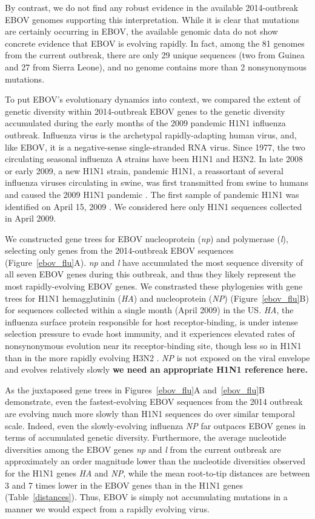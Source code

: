 \documentclass[11pt]{article}
\begin{document}
By contrast, we do not find any robust evidence in the available 2014-outbreak EBOV genomes supporting this interpretation. While it is clear that mutations are certainly occurring in EBOV, the available genomic data do not show concrete evidence that EBOV is evolving rapidly. In fact, among the 81 genomes from the current outbreak, there are only 29 unique sequences (two from Guinea and 27 from Sierra Leone), and no genome contains more than 2 nonsynonymous mutations.

To put EBOV's evolutionary dynamics into context, we compared the extent of genetic diversity within 2014-outbreak EBOV genes to the genetic diversity accumulated during the early months of the 2009 pandemic H1N1 influenza outbreak. Influenza virus is the archetypal rapidly-adapting human virus, and, like EBOV, it is a negative-sense single-stranded RNA virus. Since 1977, the two circulating seasonal influenza A strains have been H1N1 and H3N2. In late 2008 or early 2009, a new H1N1 strain, pandemic H1N1, a reassortant of several influenza viruses circulating in swine, was first transmitted from swine to humans and caused the 2009 H1N1 pandemic \cite{Smithetal2009}. The first sample of pandemic H1N1 was identified on April 15, 2009 \citep{Neumannetal2009}. We considered here only H1N1 sequences collected in April 2009. 

We constructed gene trees for EBOV nucleoprotein (\emph{np}) and polymerase (\emph{l}), selecting only genes from the 2014-outbreak EBOV sequences (Figure~\ref{ebov_flu}A). \emph{np} and \emph{l} have accumulated the most sequence diversity of all seven EBOV genes during this outbreak, and thus they likely represent the most rapidly-evolving EBOV genes. We constrasted these phylogenies with gene trees for H1N1 hemagglutinin (\emph{HA}) and nucleoprotein (\emph{NP}) (Figure~\ref{ebov_flu}B) for sequences collected within a single month (April 2009) in the US. \emph{HA}, the influenza surface protein responsible for host receptor-binding, is under intense selection pressure to evade host immunity, and it experiences elevated rates of nonsynonymous evolution near its receptor-binding site, though less so in H1N1 than in the more rapidly evolving H3N2 \citep{Meyer2012}. \emph{NP} is not exposed on the viral envelope and evolves relatively slowly \textbf{we need an appropriate H1N1 reference here.}

As the juxtaposed gene trees in Figures~\ref{ebov_flu}A and~\ref{ebov_flu}B  demonstrate, even the fastest-evolving EBOV sequences from the 2014 outbreak are evolving much more slowly than H1N1 sequences do over similar temporal scale. Indeed, even the slowly-evolving influenza \emph{NP} far outpaces EBOV genes in terms of accumulated genetic diversity. Furthermore, the average nucleotide diversities among the EBOV genes \emph{np} and \emph{l} from the current outbreak are approximately an order magnitude lower than the nucleotide diversities observed for the H1N1 genes \emph{HA} and \emph{NP}, while the mean root-to-tip distances are between 3 and 7 times lower in the EBOV genes than in the H1N1 genes (Table~\ref{distances}). Thus, EBOV is simply not accumulating mutations in a manner we would expect from a rapidly evolving virus.
\end{document}
